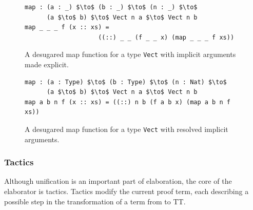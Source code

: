 \begin{figure}
\begin{lstlisting}[mathescape]
map : (a : _) $\to$ (b : _) $\to$ (n : _) $\to$ 
      (a $\to$ b) $\to$ Vect n a $\to$ Vect n b
map _ _ _ f (x :: xs) = 
                    ((::) _ _ (f _ _ x) (map _ _ _ f xs))
\end{lstlisting}
  \caption{A desugared map function for a type \texttt{Vect} with implicit
    arguments made explicit.}
  \label{fig:vect_map_desugared}
\end{figure}

\begin{figure}
\begin{lstlisting}[mathescape]
map : (a : Type) $\to$ (b : Type) $\to$ (n : Nat) $\to$ 
      (a $\to$ b) $\to$ Vect n a $\to$ Vect n b
map a b n f (x :: xs) = ((::) n b (f a b x) (map a b n f xs))
\end{lstlisting}
  \caption{A desugared map function for a type \texttt{Vect} with resolved
    implicit arguments.}
  \label{fig:vect_map_resolved}
\end{figure}

\subsubsection{Tactics}
Although unification is an important part of elaboration, the core of the
elaborator is tactics. Tactics modify the current proof term, each describing a
possible step in the transformation of a term from \IdrisM{} to TT. 


